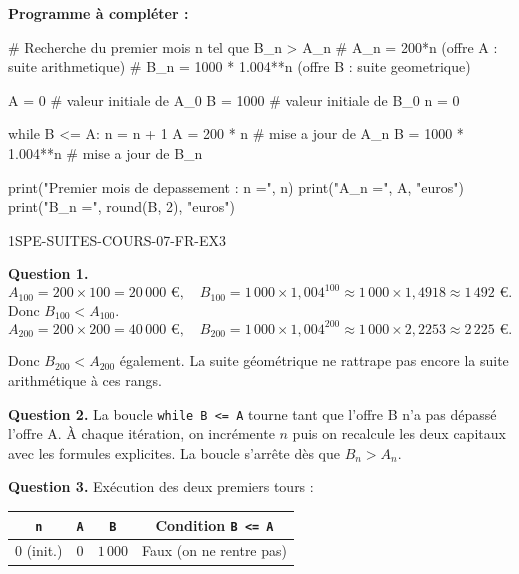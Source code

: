\noindent\textbf{Programme à compléter :}

\begin{python}
# Recherche du premier mois n tel que B_n > A_n
# A_n = 200*n  (offre A : suite arithmetique)
# B_n = 1000 * 1.004**n  (offre B : suite geometrique)

A = 0          # valeur initiale de A_0
B = 1000       # valeur initiale de B_0
n = 0

while B <= A:
    n = n + 1
    A = 200 * n        # mise a jour de A_n
    B = 1000 * 1.004**n  # mise a jour de B_n

print("Premier mois de depassement : n =", n)
print("A_n =", A, "euros")
print("B_n =", round(B, 2), "euros")
\end{python}

\begin{corrige}{1SPE-SUITES-COURS-07-FR-EX3}

\textbf{Question 1.}
\[
  A_{100} = 200 \times 100 = 20\,000 \text{ €}, \quad B_{100} = 1\,000 \times 1{,}004^{100} \approx 1\,000 \times 1{,}4918 \approx 1\,492 \text{ €.}
\]
Donc $B_{100} < A_{100}$.
\[
  A_{200} = 200 \times 200 = 40\,000 \text{ €}, \quad B_{200} = 1\,000 \times 1{,}004^{200} \approx 1\,000 \times 2{,}2253 \approx 2\,225 \text{ €.}
\]


Donc $B_{200} < A_{200}$ également. La suite géométrique ne rattrape pas encore la suite arithmétique à ces rangs.

\textbf{Question 2.} La boucle \texttt{while B <= A} tourne tant que l'offre B n'a pas dépassé l'offre A. À chaque itération, on incrémente $n$ puis on recalcule les deux capitaux avec les formules explicites. La boucle s'arrête dès que $B_n > A_n$.

\textbf{Question 3.} Exécution des deux premiers tours :

\begin{center}
\begin{tabular}{|c|c|c|c|}
\hline
\texttt{n} & \texttt{A} & \texttt{B} & Condition \texttt{B <= A} \\
\hline
$0$ (init.) & $0$ & $1\,000$ & Faux (on ne rentre pas) \\
\hline
\end{tabular}
\end{center}



\end{corrige}
